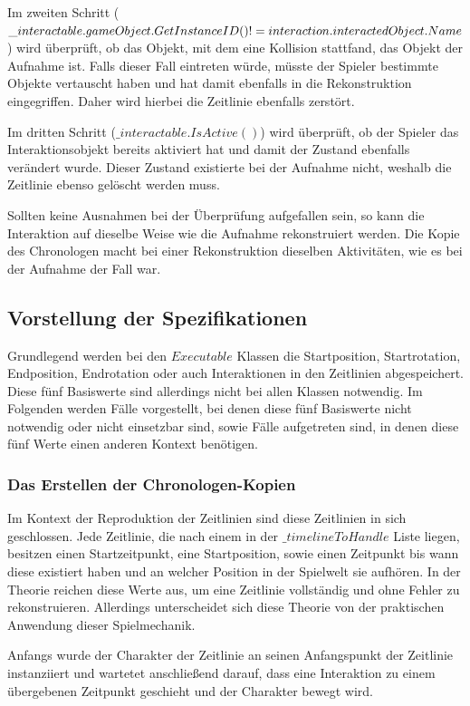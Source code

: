 Im zweiten Schritt ($\_interactable.gameObject.GetInstanceID() \\!= interaction.interactedObject.Name$) wird überprüft, ob das Objekt, mit dem eine Kollision stattfand, das Objekt der Aufnahme ist. Falls dieser Fall eintreten würde, müsste der Spieler bestimmte Objekte vertauscht haben und hat damit ebenfalls in die Rekonstruktion eingegriffen. Daher wird hierbei die Zeitlinie ebenfalls zerstört.

Im dritten Schritt ($\_interactable.IsActive()$) wird überprüft, ob der Spieler das Interaktionsobjekt bereits aktiviert hat und damit der Zustand ebenfalls verändert wurde. Dieser Zustand existierte bei der Aufnahme nicht, weshalb die Zeitlinie ebenso gelöscht werden muss.

Sollten keine Ausnahmen bei der Überprüfung aufgefallen sein, so kann die Interaktion auf dieselbe Weise wie die Aufnahme rekonstruiert werden. Die Kopie des Chronologen macht bei einer Rekonstruktion dieselben Aktivitäten, wie es bei der Aufnahme der Fall war.

\subsection{Vorstellung der Spezifikationen}\label{sec:recordable-specifications}
Grundlegend werden bei den $Executable$ Klassen die Startposition, Startrotation, Endposition, Endrotation oder auch Interaktionen in den Zeitlinien abgespeichert. Diese fünf Basiswerte sind allerdings nicht bei allen Klassen notwendig. Im Folgenden werden Fälle vorgestellt, bei denen diese fünf Basiswerte nicht notwendig oder nicht einsetzbar sind, sowie Fälle aufgetreten sind, in denen diese fünf Werte einen anderen Kontext benötigen.
\subsubsection{Das Erstellen der Chronologen-Kopien}
Im Kontext der Reproduktion der Zeitlinien sind diese Zeitlinien in sich geschlossen. Jede Zeitlinie, die nach einem  in der $\_timelineToHandle$ Liste liegen, besitzen einen Startzeitpunkt, eine Startposition, sowie einen Zeitpunkt bis wann diese existiert haben und an welcher Position in der Spielwelt sie aufhören. In der Theorie reichen diese Werte aus, um eine Zeitlinie vollständig und ohne Fehler zu rekonstruieren. Allerdings unterscheidet sich diese Theorie von der praktischen Anwendung dieser Spielmechanik. 

Anfangs wurde der Charakter der Zeitlinie an seinen Anfangspunkt der Zeitlinie instanziiert und wartetet anschließend darauf, dass eine Interaktion zu einem übergebenen Zeitpunkt geschieht und der Charakter bewegt wird.

